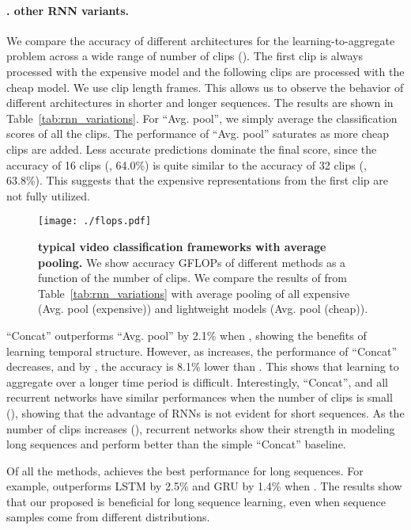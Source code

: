 \documentclass[10pt,twocolumn,letterpaper]{article}
\begin{document}
{{\paragraph{\ours \vs. other RNN variants.} 
We compare the accuracy of different architectures for the learning-to-aggregate problem  across a wide range of number of clips (). The first clip is always processed with the expensive model and the following  clips are processed with the cheap model. We use clip length  frames. This allows us to observe the behavior of different architectures in shorter and longer sequences. The results are shown in Table~\ref{tab:rnn_variations}. For ``Avg. pool'', we simply average the classification scores of all the clips. The performance of ``Avg. pool'' saturates as more cheap clips are added. Less accurate predictions dominate the final score, since the accuracy of 16 clips (\ie, 64.0\%) is quite similar to the accuracy of 32 clips (\ie, 63.8\%). This suggests that the expensive representations from the first clip are not fully utilized.

\begin{figure}[t]
\texttt{[image: ./flops.pdf]}
\caption{
    {\bf \oursfr \vs typical video classification frameworks with average pooling.} We show accuracy \vs GFLOPs of different methods as a function of the number of clips. We compare the results of \ours from Table~\ref{tab:rnn_variations} with average pooling of all expensive (Avg. pool (expensive)) and lightweight models (Avg. pool (cheap)).
}
    \label{fig:flops_comparison}
\end{figure}


``Concat'' outperforms ``Avg. pool'' by 2.1\% when , showing the benefits of learning temporal structure. However, as  increases, the performance of ``Concat'' decreases, and by , the accuracy is 8.1\% lower than . This shows that  learning to aggregate over a longer time period is difficult. Interestingly, ``Concat'', and all recurrent networks have similar performances when the number of clips is small (), showing that the advantage of RNNs is not evident for short sequences. As the number of clips increases (), recurrent networks show their strength in modeling long sequences and perform better than the simple ``Concat'' baseline. 

Of all the methods, \ours achieves the best performance for long sequences. For example, \ours outperforms LSTM by 2.5\% and GRU by 1.4\% when .
The results show that our proposed \ours is beneficial for long sequence learning, even when sequence samples come from different distributions.




}}
\end{document}
